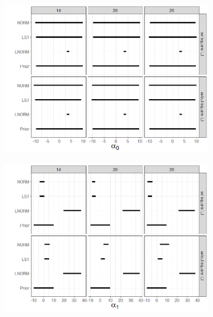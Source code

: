 \documentclass{article}
\begin{document}
\begin{figure}[hbt!]

\begin{subfigure}{.475\linewidth}
  \includegraphics[width=\linewidth]{../../Images/alpha0_post.png}
\end{subfigure}\hfill %
\begin{subfigure}{.475\linewidth}
  \includegraphics[width=\linewidth]{../../Images/alpha1_post.png}
\end{subfigure}


\end{figure}
\end{document}
